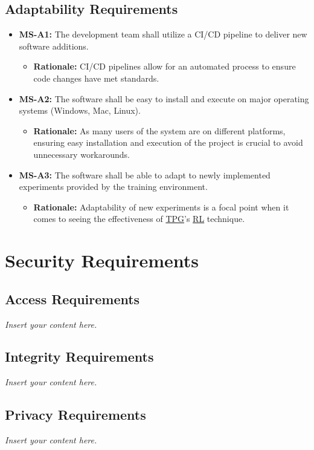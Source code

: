 \documentclass[12pt]{article}
\newcommand{\lips}{\textit{Insert your content here.}}
\begin{document}
\subsection{Adaptability Requirements}
\begin{itemize}
  \item \textbf{MS-A1:} The development team shall utilize a CI/CD pipeline to deliver new software additions.
  \begin{itemize}
    \item \textbf{Rationale:} CI/CD pipelines allow for an automated process to ensure code changes have met standards. 
  \end{itemize}
  \item \textbf{MS-A2:} The software shall be easy to install and execute on major operating systems (Windows, Mac, Linux).

  \begin{itemize}
    \item \textbf{Rationale:} As many users of the system are on different platforms, ensuring easy installation and execution of the project is crucial to avoid unnecessary workarounds.
  \end{itemize}
  \item \textbf{MS-A3:} The software shall be able to adapt to newly implemented experiments provided by the training environment.
  \begin{itemize}
    \item \textbf{Rationale:} Adaptability of new experiments is a focal point when it comes to seeing the effectiveness of \hyperref[def:tpg]{TPG}’s \hyperref[def:rl]{RL} technique.
  \end{itemize}
\end{itemize}



\section{Security Requirements}
\subsection{Access Requirements}
\lips
\subsection{Integrity Requirements}
\lips
\subsection{Privacy Requirements}
\lips
\end{document}
